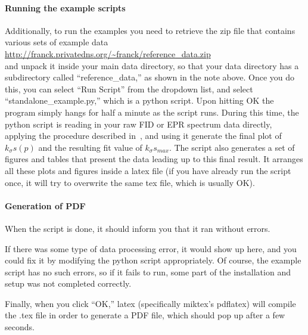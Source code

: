 \paragraph{Running the example scripts}
Additionally, to run the examples
    you need to retrieve the zip file
    that contains various sets of example data\\ 
    \url{http://franck.privatedns.org/~franck/reference_data.zip}\\ 
and unpack it inside your main data directory,
    so that your data directory has a subdirectory called
    ``reference\_data,'' as shown in the note above.
Once you do this, you can select ``Run Script'' from the dropdown
    list,
    and select ``standalone\_example.py,''
    which is a python script.
Upon hitting OK the program simply hangs for
    half a minute
    as the script runs.
During this time,
    the python script is reading in your raw FID or
    EPR spectrum data directly,
    applying the procedure described in~\cite{FranckPNMRS},
    and using it generate the final plot of $k_\sigma s(p)$
    and the resulting fit value of $k_\sigma s_{max}$.
The script also generates a set of figures and tables
    that present the data leading up to this final result.
It arranges all these plots and figures inside a latex file
    (if you have already run the script once, it will try to
    overwrite the same tex file, which is usually OK).
\paragraph{Generation of PDF}
When the script is done, it should inform you that it ran without
    errors.
\begin{inplacenotebox}
    If there was some type of data processing error,
        it would show up here, and you could fix it  by modifying the
        python script appropriately.
    Of course, the example script has no such errors,
        so if it fails to run,
        some part of the installation and setup was not completed correctly.
\end{inplacenotebox}
Finally, when you click ``OK,'' latex (specifically miktex's pdflatex)
    will compile the .tex file in order to generate a PDF file,
    which should pop up after a few seconds.
